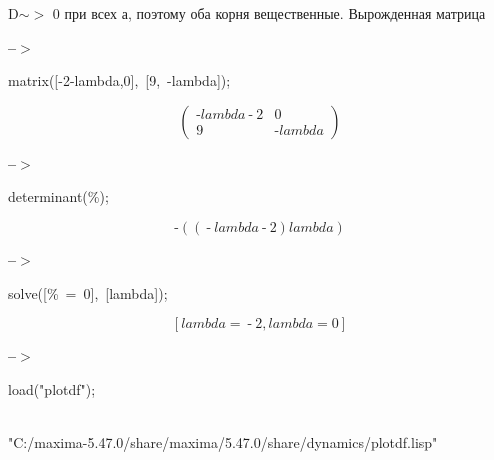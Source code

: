 \documentclass[fleqn]{article}
\begin{document}
\[\tag{\% o48} 
\mbox{}
\]
D\ensuremath{\sim }\ensuremath{>} 0 при всех а, поэтому оба корня вещественные.
Вырожденная матрица


\noindent
\begin{minipage}[t]{4.000000em}\color{red}\bfseries
 --\ensuremath{\ensuremath{>}}	
\end{minipage}
\begin{minipage}[t]{\textwidth}\color{blue}
matrix([-2-lambda,0],\ [9,\ -lambda]);
\end{minipage}
\[\displaystyle \tag{\% o56} 
\begin{pmatrix}\operatorname{-}lambda\operatorname{-}2 & 0\\
9 & \operatorname{-}lambda\end{pmatrix}\mbox{}
\]


\noindent
\begin{minipage}[t]{4.000000em}\color{red}\bfseries
 --\ensuremath{\ensuremath{>}}	
\end{minipage}
\begin{minipage}[t]{\textwidth}\color{blue}
determinant(\%);\\

\end{minipage}
\[\displaystyle \tag{\% o57} 
\operatorname{-}\left( \left( \operatorname{-}lambda\operatorname{-}2\right)  lambda\right) \mbox{}
\]


\noindent
\begin{minipage}[t]{4.000000em}\color{red}\bfseries
 --\ensuremath{\ensuremath{>}}	
\end{minipage}
\begin{minipage}[t]{\textwidth}\color{blue}
solve([\%\ =\ 0],\ [lambda]);
\end{minipage}
\[\displaystyle \tag{\% o58} 
\left[ lambda\operatorname{=}\operatorname{-}2\operatorname{,}lambda\operatorname{=}0\right] \mbox{}
\]


\noindent
\begin{minipage}[t]{4.000000em}\color{red}\bfseries
 --\ensuremath{\ensuremath{>}}	
\end{minipage}
\begin{minipage}[t]{\textwidth}\color{blue}
load("plotdf");\\

\end{minipage}
\[\displaystyle \tag{\% o49} 
\mbox{}
\]\mbox{}\\"C:/maxima-5.47.0/share/maxima/5.47.0/share/dynamics/plotdf.lisp"
\end{document}
